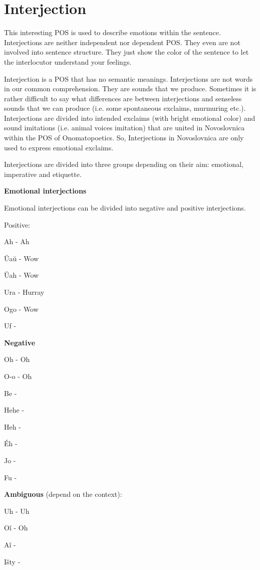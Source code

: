 \section{Interjection}

This interesting POS is used to describe emotions within the sentence. Interjections are neither independent nor dependent POS. They even are not involved into sentence structure. They just show the color of the sentence to let the interlocutor understand your feelings. 

Interjection is a POS that has no semantic meanings. Interjections are not words in our common comprehension. They are sounds that we produce. Sometimes it is rather difficult to say what differences are between interjections and senseless sounds that we can produce (i.e. some spontaneous exclaims, murmuring etc.). Interjections are divided into intended exclaims (with bright emotional color) and sound imitations (i.e. animal voices imitation) that are united in Novoslovnica within the POS of Onomatopoetics. So, Interjections in Novoslovnica are only used to express emotional exclaims.

Interjections are divided into three groups depending on their aim: emotional, imperative and etiquette. 

\textbf{Emotional interjections}

Emotional interjections can be divided into negative and positive interjections.

Positive:

Ah - Ah

Ŭaŭ - Wow

Ŭah - Wow

Ura - Hurray

Ogo - Wow

Uf - 

\textbf{Negative}

Oh - Oh

O-o - Oh

Be - 

Hehe -

Heh -  

Éh - 

Jo - 

Fu - 

\textbf{Ambiguous} (depend on the context):

Uh - Uh

Oǐ - Oh

Aǐ - 

Išty - 

